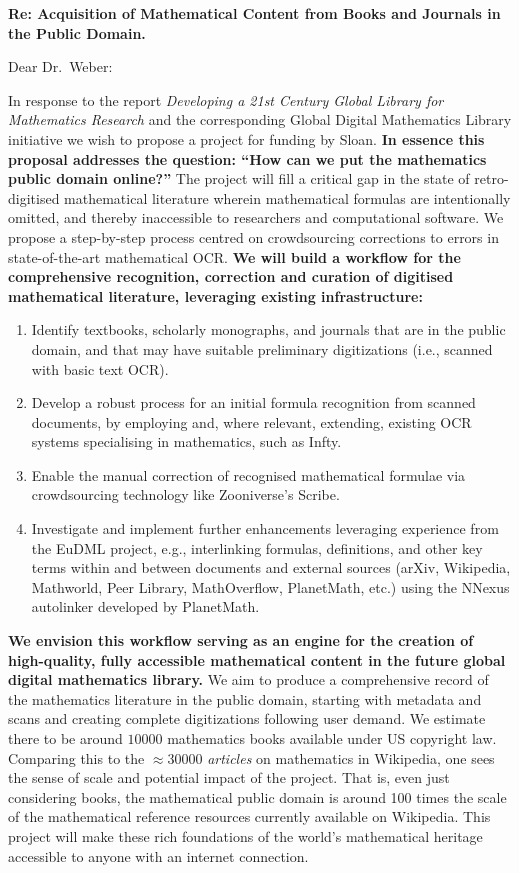 \documentclass[10pt,letterpaper]{article}
\begin{document}
\thispagestyle{empty}

\noindent\textbf{Re: \quad Acquisition of Mathematical Content from Books and Journals in the Public Domain.}

\bigskip

\noindent Dear Dr.~Weber:

\bigskip

In response to the report \emph{Developing a 21st Century Global
  Library for Mathematics Research} and the corresponding Global
Digital Mathematics Library initiative we wish to propose a project
for funding by Sloan.  \textbf{In essence this proposal addresses the
  question: ``How can we put the mathematics public domain online?''}
The project will fill a critical gap in the state of retro-digitised
mathematical literature wherein mathematical formulas are
intentionally omitted, and thereby inaccessible to researchers and
computational software.  We propose a step-by-step process centred on
crowdsourcing corrections to errors in state-of-the-art mathematical
OCR.  \textbf{We will build a workflow for the comprehensive
  recognition, correction and curation of digitised mathematical
  literature, leveraging existing infrastructure:}
\begin{enumerate}
\item Identify textbooks, scholarly monographs, and journals that are
  in the public domain, and that may have suitable preliminary
  digitizations (i.e., scanned with basic text OCR).
\item Develop a robust process for an initial formula recognition from scanned 
documents, by employing and, where relevant, extending, existing OCR systems 
specialising in mathematics, such as {\sf Infty}.
\item Enable 
the manual correction of recognised mathematical formulae via crowdsourcing 
technology like Zooniverse's {\sf Scribe}.
\item Investigate and implement further enhancements leveraging
  experience from the EuDML project, e.g., interlinking formulas,
  definitions, and other key terms within and between documents and
  external sources (arXiv, Wikipedia, Mathworld, Peer Library,
  MathOverflow, PlanetMath, etc.) using the {\sf NNexus} autolinker
  developed by PlanetMath.
\end{enumerate}
\textbf{We envision this workflow serving as an engine for the
  creation of high-quality, fully accessible mathematical content in
  the future global digital mathematics library.}  We aim to produce a
comprehensive record of the mathematics literature in the public
domain, starting with metadata and scans and creating complete
digitizations following user demand.  We estimate there to be around
$10000$ mathematics books available under US copyright law.  Comparing
this to the $\approx$30000 \emph{articles} on mathematics in
Wikipedia, one sees the sense of scale and potential impact of the
project.  That is, even just considering books, the mathematical
public domain is around 100 times the scale of the mathematical
reference resources currently available on Wikipedia.  This project
will make these rich foundations of the world's mathematical heritage
accessible to anyone with an internet connection.
\end{document}
